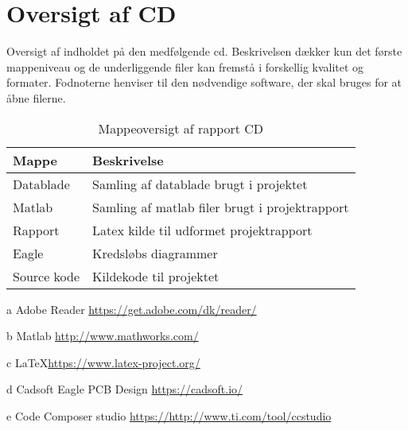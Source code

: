 \chapter{Oversigt af CD}\label{bilag:cd}
Oversigt af indholdet på den medfølgende cd. Beskrivelsen dækker kun det første mappeniveau og de underliggende filer kan fremstå i forskellig kvalitet og formater. Fodnoterne henviser til den nødvendige software, der skal bruges for at åbne filerne.

\begin{table}[h!]
\centering
\caption{Mappeoversigt af rapport CD}
\label{tab:ordliste}
\begin{threeparttable}
\begin{tabular}{l l}
\toprule
\multicolumn{1}{l}{Mappe}       &
\multicolumn{1}{l}{Beskrivelse}  \\ 
\midrule
Datablade					& Samling af datablade brugt i projektet \tnote{a}\\
Matlab						& Samling af matlab filer brugt i projektrapport\tnote{b} \\
Rapport						& Latex kilde til udformet projektrapport\tnote{c} \\
Eagle						& Kredsløbs diagrammer\tnote{d} \\
Source kode                 & Kildekode til projektet \tnote{e}\\
\bottomrule
\end{tabular}
\begin{tablenotes}
\item[a] Adobe Reader  \url{https://get.adobe.com/dk/reader/}
\item[b] Matlab \url{http://www.mathworks.com/}
\item[c] \LaTeX \url{https://www.latex-project.org/}
\item[d] Cadsoft Eagle PCB Design \url{https://cadsoft.io/}
\item[e] Code Composer studio \url{https://http://www.ti.com/tool/ccstudio}
\end{tablenotes}
\end{threeparttable}
\end{table}
\label{LastPage}
